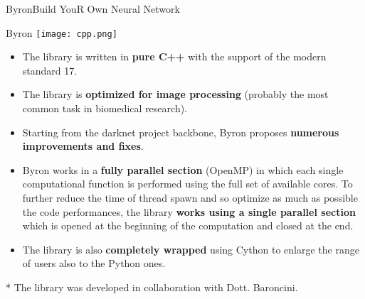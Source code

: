 \documentclass{standalone}
\begin{document}
\begin{frame}{Byron}{Build YouR Own Neural Network}



  \begin{alertblock}{Byron \hfill\texttt{[image: cpp.png]}}
    \begin{itemize}
      \item The library is written in \textbf{pure \textsf{C++}} with the support of the modern standard 17.

      \item The library is \textbf{optimized for image processing} (probably the most common task in biomedical research).

      \item Starting from the \textsf{darknet project} backbone, \textsf{Byron} proposes \textbf{numerous improvements and fixes}.

      \item \textsf{Byron} works in a \textbf{fully parallel section} (\textsf{OpenMP}) in which each single computational function is performed using the full set of available cores. To further reduce the time of thread spawn and so optimize as much as possible the code performances, the library \textbf{works using a single parallel section} which is opened at the beginning of the computation and closed at the end.

      \item The library is also \textbf{completely wrapped} using \textsf{Cython} to enlarge the range of users also to the \textsf{Python} ones.

    \end{itemize}
  \end{alertblock}

  \vfill\scriptsize{* The library was developed in collaboration with Dott. Baroncini.}

\end{frame}
\end{document}
